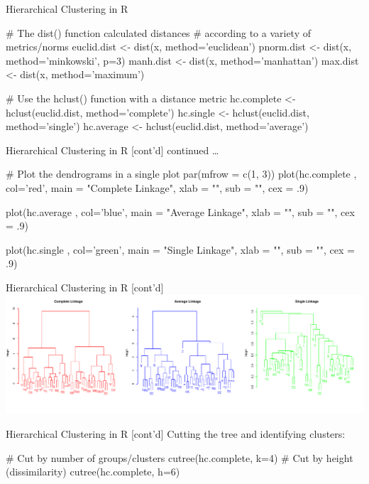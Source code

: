 \documentclass[ignorenonframetext,xcolor=x11names]{beamer}
\begin{document}
\begin{frame}[fragile]{Hierarchical Clustering in R}
\begin{Rcode}
# The dist() function calculated distances
# according to a variety of metrics/norms
euclid.dist <- dist(x, method='euclidean')
pnorm.dist <- dist(x, method='minkowski', p=3)
manh.dist <- dist(x, method='manhattan')
max.dist <- dist(x, method='maximum')

# Use the hclust() function with a distance metric
hc.complete <- hclust(euclid.dist, method='complete')
hc.single <- hclust(euclid.dist, method='single')
hc.average <- hclust(euclid.dist, method='average')
\end{Rcode}
\end{frame}

\begin{frame}[fragile]{Hierarchical Clustering in R \small [cont'd]}
continued \ldots
\begin{Rcode}
# Plot the dendrograms in a single plot
par(mfrow = c(1, 3))
plot(hc.complete , col='red', 
   main = "Complete Linkage", 
   xlab = "", sub = "", cex = .9)

plot(hc.average , col='blue', 
   main = "Average Linkage", 
   xlab = "", sub = "", cex = .9)

plot(hc.single , col='green', 
   main = "Single Linkage",
   xlab = "", sub = "", cex = .9)
\end{Rcode}
\end{frame}

\begin{frame}{Hierarchical Clustering in R \small [cont'd]}
\centering
\includegraphics[width=\textwidth]{hclust.pdf}
\end{frame}

\begin{frame}[fragile]{Hierarchical Clustering in R \small [cont'd]}
Cutting the tree and identifying clusters:
\begin{Rcode}
# Cut by number of groups/clusters
cutree(hc.complete, k=4)
# Cut by height (dissimilarity)
cutree(hc.complete, h=6)
\end{Rcode}
\end{frame}
\end{document}
